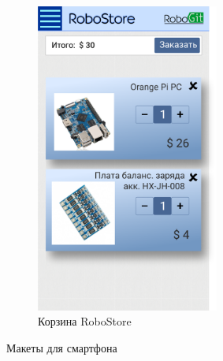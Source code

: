 \documentclass[12pt, a4paper]{article}
\begin{document}
\begin{figure}
  \centering
  \begin{subfigure}[b]{0.47\textwidth}
    \includegraphics[width=6cm]{png/store_bin_smart.png}
    \caption{Корзина RoboStore}
  \end{subfigure}
  \caption{Макеты для смартфона }
\end{figure}
\end{document}
